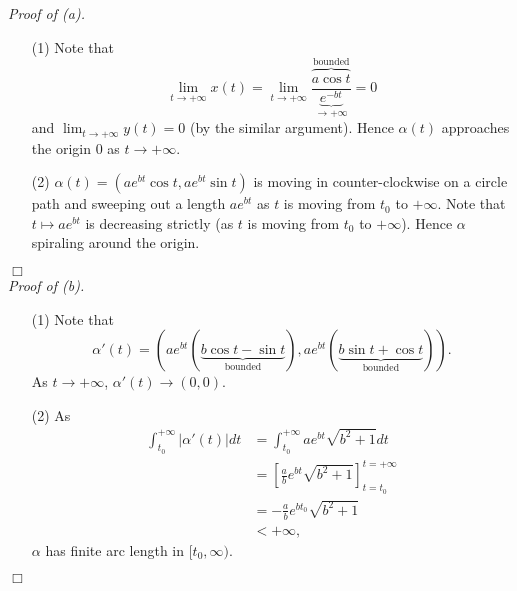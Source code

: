 \documentclass{article}
\begin{document}
\emph{Proof of (a).}
\begin{enumerate}
\item[(1)]
  Note that
  \[
    \lim_{t \to +\infty} x(t)
    = \lim_{t \to +\infty} \frac{\overbrace{a \cos t}^{\text{bounded}}}
      {\underbrace{e^{-bt}}_{\to +\infty}}
    = 0
  \]
  and $\lim_{t \to +\infty} y(t) = 0$ (by the similar argument).
  Hence $\alpha(t)$ approaches the origin $0$ as $t \to +\infty$.

\item[(2)]
  $\alpha(t) = (ae^{bt} \cos t, ae^{bt} \sin t)$
  is moving in counter-clockwise on a circle path and
  sweeping out a length $ae^{bt}$ as $t$ is moving from $t_0$ to $+\infty$.
  Note that $t \mapsto ae^{bt}$ is decreasing strictly (as $t$ is moving from $t_0$ to $+\infty$).
  Hence $\alpha$ spiraling around the origin.
\end{enumerate}
$\Box$ \\



\emph{Proof of (b).}
\begin{enumerate}
\item[(1)]
  Note that
  \[
    \alpha'(t)
    = ( ae^{bt} (\underbrace{b\cos t - \sin t}_{\text{bounded}}),
      ae^{bt} (\underbrace{b\sin t + \cos t}_{\text{bounded}}) ).
  \]
  As $t \to +\infty$, $\alpha'(t) \to (0,0)$.

\item[(2)]
  As
  \begin{align*}
    \int_{t_0}^{+\infty} |\alpha'(t)| dt
    &= \int_{t_0}^{+\infty} ae^{bt} \sqrt{b^2 + 1} dt \\
    &= \left[ \frac{a}{b} e^{bt} \sqrt{b^2 + 1} \right]_{t = t_0}^{t = +\infty} \\
    &= - \frac{a}{b} e^{bt_0} \sqrt{b^2 + 1} \\
    &< +\infty,
  \end{align*}
  $\alpha$ has finite arc length in $[t_0,\infty)$.
\end{enumerate}
$\Box$ \\\\



\end{document}
